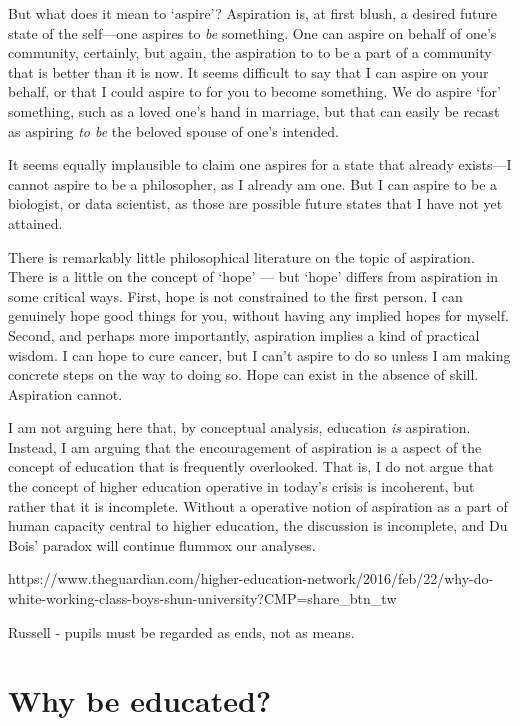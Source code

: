 But what does it mean to `aspire'? Aspiration is, at first blush, a desired future state of the self---one aspires to \emph{be} something. One can aspire on behalf of one's community, certainly, but again, the aspiration to to be a part of a community that is better than it is now. It seems difficult to say that I can aspire on your behalf, or that I could aspire to for you to become something. We do aspire `for' something, such as a loved one's hand in marriage, but that can easily be recast as aspiring \emph{to be} the beloved spouse of one's intended.

It seems equally implausible to claim one aspires for a state that already exists---I cannot aspire to be a philosopher, as I already am one. But I can aspire to be a biologist, or data scientist, as those are possible future states that I have not yet attained. 

There is remarkably little philosophical literature on the topic of aspiration. There is a little on the concept of `hope' --- but `hope' differs from aspiration in some critical ways. First, hope is not constrained to the first person. I can genuinely hope good things for you, without having any implied hopes for myself. Second, and perhaps more importantly, aspiration implies a kind of practical wisdom. I can hope to cure cancer, but I can't aspire to do so unless I am making concrete steps on the way to doing so. Hope can exist in the absence of skill. Aspiration cannot.

I am not arguing here that, by conceptual analysis, education \emph{is} aspiration. Instead, I am arguing that the encouragement of aspiration is a aspect of the concept of education that is frequently overlooked. That is, I do not argue that the concept of higher education operative in today's crisis is incoherent, but rather that it is incomplete. Without a operative notion of aspiration as a part of human capacity central to higher education, the discussion is incomplete, and Du Bois' paradox will continue flummox our analyses. 

https:\slash \slash www.theguardian.com\slash higher-education-network\slash 2016\slash feb\slash 22\slash why-do-white-working-class-boys-shun-university?CMP=share\_btn\_tw

Russell - pupils must be regarded as ends, not as means. ~\citep[P. 57--58]{Russell:GWZfGDU3}

\section{Why be educated?}
\label{whybeeducated}

